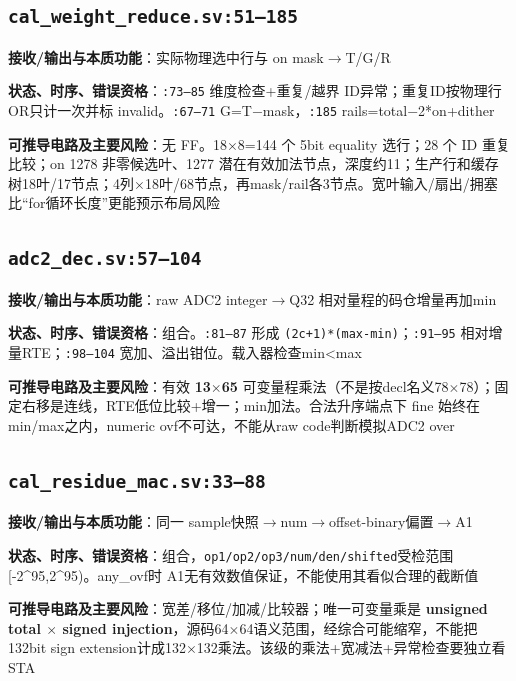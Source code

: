 \documentclass[UTF8,fontset=fandol,10pt,a4paper,openany]{ctexrep}
\newcommand{\code}[1]{\nolinkurl{#1}}
\begin{document}
\subsection*{\code{cal_weight_reduce.sv:51–185}}
\noindent\textbf{接收/输出与本质功能}：实际物理选中行与 on mask\ensuremath{\rightarrow}T/G/R\par
\noindent\textbf{状态、时序、错误资格}：\code{:73–85} 维度检查+重复/越界 ID异常；重复ID按物理行OR只计一次并标 invalid。\code{:67–71} G=T\ensuremath{-}mask，\code{:185} rails=total\ensuremath{-}2*on+dither\par
\noindent\textbf{可推导电路及主要风险}：无 FF。18\ensuremath{\times}8=144 个 5bit equality 选行；28 个 ID 重复比较；on 1278 非零候选叶、1277 潜在有效加法节点，深度约11；生产行和缓存树18叶/17节点；4列\ensuremath{\times}18叶/68节点，再mask/rail各3节点。宽叶输入/扇出/拥塞比“for循环长度”更能预示布局风险\par
\subsection*{\code{adc2_dec.sv:57–104}}
\noindent\textbf{接收/输出与本质功能}：raw ADC2 integer\ensuremath{\rightarrow}Q32 相对量程的码仓增量再加min\par
\noindent\textbf{状态、时序、错误资格}：组合。\code{:81–87} 形成 \code{(2c+1)*(max-min)}；\code{:91–95} 相对增量RTE；\code{:98–104} 宽加、溢出钳位。载入器检查min<max\par
\noindent\textbf{可推导电路及主要风险}：有效 \textbf{13\ensuremath{\times}65} 可变量程乘法（不是按decl名义78\ensuremath{\times}78）；固定右移是连线，RTE低位比较+增一；min加法。合法升序端点下 fine 始终在min/max之内，numeric ovf不可达，不能从raw code判断模拟ADC2 over\par
\subsection*{\code{cal_residue_mac.sv:33–88}}
\noindent\textbf{接收/输出与本质功能}：同一 sample快照\ensuremath{\rightarrow}num\ensuremath{\rightarrow}offset-binary偏置\ensuremath{\rightarrow}A1\par
\noindent\textbf{状态、时序、错误资格}：组合，\code{op1/op2/op3/num/den/shifted}受检范围[-2\textasciicircum{}95,2\textasciicircum{}95)。any\_ovf时 A1无有效数值保证，不能使用其看似合理的截断值\par
\noindent\textbf{可推导电路及主要风险}：宽差/移位/加减/比较器；唯一可变量乘是 \textbf{unsigned total \ensuremath{\times} signed injection}，源码64\ensuremath{\times}64语义范围，经综合可能缩窄，不能把132bit sign extension计成132\ensuremath{\times}132乘法。该级的乘法+宽减法+异常检查要独立看STA\par
\end{document}
